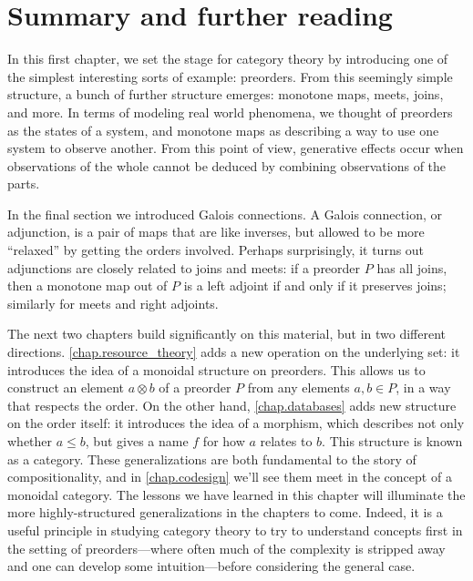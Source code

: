 \documentclass[7Sketches]{subfiles}
\begin{document}
%
%
\section{Summary and further reading}%
\label{ch1.further_reading}

In this first chapter, we set the stage for category theory by introducing
one of the simplest interesting sorts of example: preorders. From this seemingly
simple structure, a bunch of further structure emerges:
monotone maps, meets, joins, and more. In terms of modeling real world phenomena, we
thought of preorders as the states of a system, and monotone maps as describing a
way to use one system to observe another. From this point of view, generative
effects occur when observations of the whole cannot be deduced by combining observations of the parts.

In the final section we introduced Galois connections. A Galois connection, or adjunction, is a pair of maps that are like inverses, but allowed to be more ``relaxed'' by getting the orders involved. Perhaps
surprisingly, it turns out adjunctions are closely related to joins and meets:
if a preorder $P$ has all joins, then a monotone map out of $P$ is a left adjoint if and only if it preserves joins; similarly for meets and right adjoints.

The next two chapters build significantly on this material, but in two different
directions. \cref{chap.resource_theory} adds a new operation on the underlying
set: it introduces the idea of a monoidal structure on preorders. This allows us to
construct an element $a \otimes b$ of a preorder $P$ from any elements $a, b \in
P$, in a way that respects the order. On the other hand,
\cref{chap.databases} adds new structure on the order itself: it introduces the
idea of a morphism, which describes not only whether $a \le b$, but gives a name
$f$ for how $a$ relates to $b$. This structure is known as a category.
These generalizations are both fundamental to the story of compositionality, and
in \cref{chap.codesign} we'll see them meet in the concept of a monoidal
category.  The lessons we have learned in this chapter will illuminate the
more highly-structured generalizations in the chapters to come.  Indeed, it is a
useful principle in studying category theory to try to understand concepts first
in the setting of preorders---where often much of the complexity is stripped away
and one can develop some intuition---before considering the general case.
\end{document}
